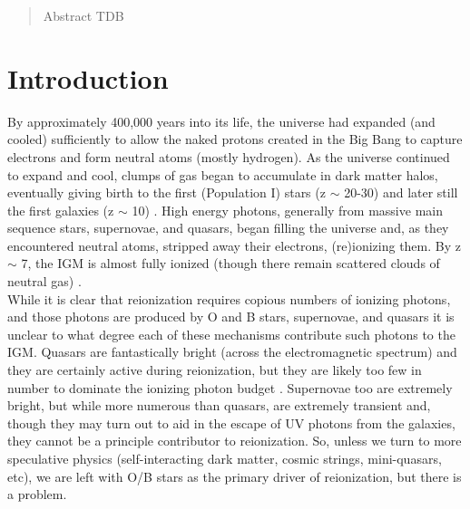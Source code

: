\documentclass{aastex62}
\begin{document}

\author[0000-0002-8925-9769]{Dustin Davis}


\begin{abstract}

Abstract TDB

\end{abstract}




\section{Introduction} \label{sec:intro}

By approximately 400,000 years into its life, the universe had expanded (and cooled) sufficiently to allow the naked protons created in the Big Bang to capture electrons and form neutral atoms (mostly hydrogen). As the universe continued to expand and cool, clumps of gas began to accumulate in dark matter halos, eventually giving birth to the first (Population I) stars (z $\sim$ 20-30) and later still the first galaxies (z $\sim$ 10) \cite{Bromm}. High energy photons, generally from massive main sequence stars, supernovae, and quasars, began filling the universe and, as they encountered neutral atoms, stripped away their electrons, (re)ionizing them. By z $\sim$ 7, the IGM is almost fully ionized (though there remain scattered clouds of neutral gas) \cite{Stark}.\\

While it is clear that reionization requires copious numbers of ionizing photons, and those photons are produced by O and B stars, supernovae, and quasars it is unclear to what degree each of these mechanisms contribute such photons to the IGM. Quasars are fantastically bright (across the electromagnetic spectrum) and they are certainly active during reionization, but they are likely too few in number to dominate the ionizing photon budget \cite{Bromm}. Supernovae too are extremely bright, but while more numerous than quasars, are extremely transient and, though they may turn out to aid in the escape of UV photons from the galaxies, they cannot be a principle contributor to reionization. So, unless we turn to more speculative physics (self-interacting dark matter, cosmic strings, mini-quasars, etc), we are left with O/B stars as the primary driver of reionization, but there is a problem.\\
\end{document}
